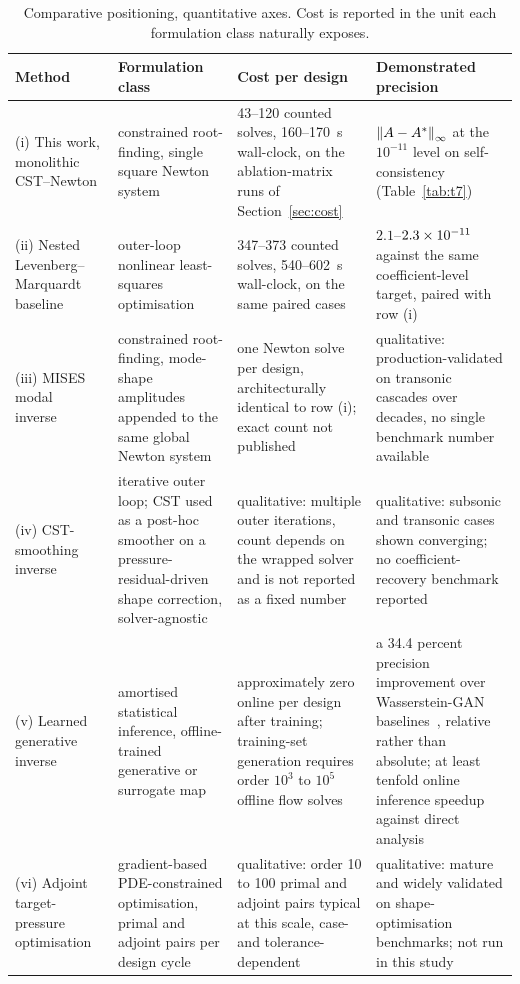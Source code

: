 \begin{table}[p]
\centering
\caption{Comparative positioning, quantitative axes. Cost is reported in the
unit each formulation class naturally exposes.}
\label{tab:comparison-quant}
\footnotesize
\begin{tabularx}{\textwidth}{@{}>{\raggedright\arraybackslash}p{2.45cm} L L L@{}}
\toprule
Method & Formulation class & Cost per design & Demonstrated precision \\
\midrule
(i) This work, monolithic CST--Newton &
  constrained root-finding, single square Newton system &
  43--120 counted solves, 160--170~s wall-clock, on the ablation-matrix runs
  of Section~\ref{sec:cost} &
  $\left\|A-A^\ast\right\|_\infty$ at the $10^{-11}$ level on self-consistency
  (Table~\ref{tab:t7}) \\
(ii) Nested Levenberg--Marquardt baseline~\citep{virtanen2020scipy} &
  outer-loop nonlinear least-squares optimisation &
  347--373 counted solves, 540--602~s wall-clock, on the same paired cases &
  $2.1$--$2.3\times10^{-11}$ against the same coefficient-level target, paired
  with row (i) \\
(iii) MISES modal inverse~\citep{drela1990viscous} &
  constrained root-finding, mode-shape amplitudes appended to the same global
  Newton system &
  one Newton solve per design, architecturally identical to row (i); exact
  count not published &
  qualitative: production-validated on transonic cascades over decades, no
  single benchmark number available \\
(iv) CST-smoothing inverse~\citep{lane2010inverse} &
  iterative outer loop; CST used as a post-hoc smoother on a
  pressure-residual-driven shape correction, solver-agnostic &
  qualitative: multiple outer iterations, count depends on the wrapped solver
  and is not reported as a fixed number &
  qualitative: subsonic and transonic cases shown converging; no
  coefficient-recovery benchmark reported \\
(v) Learned generative inverse~\citep{yilmaz2020cgan,deng2025cddpm,wong2024lfpinn} &
  amortised statistical inference, offline-trained generative or surrogate map &
  approximately zero online per design after training; training-set generation
  requires order $10^3$ to $10^5$ offline flow solves &
  a 34.4 percent precision improvement over Wasserstein-GAN
  baselines~\citep{deng2025cddpm}, relative rather than absolute; at least
  tenfold online inference speedup against direct
  analysis~\citep{wong2024lfpinn} \\
(vi) Adjoint target-pressure optimisation~\citep{economon2016su2} &
  gradient-based PDE-constrained optimisation, primal and adjoint pairs per
  design cycle &
  qualitative: order 10 to 100 primal and adjoint pairs typical at this scale,
  case- and tolerance-dependent &
  qualitative: mature and widely validated on shape-optimisation benchmarks;
  not run in this study \\
\bottomrule
\end{tabularx}
\end{table}

